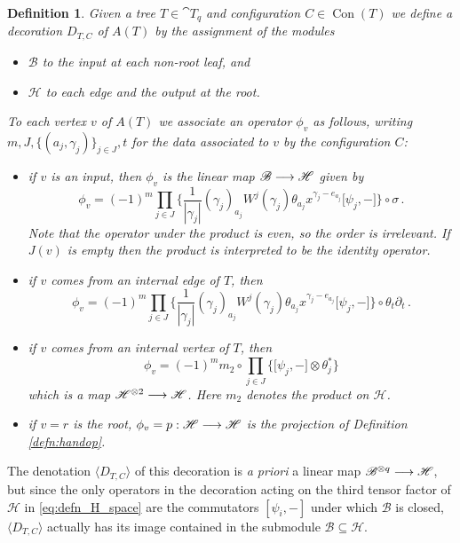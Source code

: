 \documentclass[english,letter paper,12pt,leqno]{article}
\theoremstyle{example}
\newtheorem{definition}[theorem]{Definition}
\numberwithin{equation}{section}
\def\be{\begin{equation}}
\def\ee{\end{equation}}
\begin{document}
\begin{definition} Given a tree $T \in \cat{T}_q$ and configuration $C \in \operatorname{Con}(T)$ we define a decoration $D_{T,C}$ of $A(T)$ by the assignment of the modules
\begin{itemize}
\item $\mathscr{B}$ to the input at each non-root leaf, and
\item $\mathscr{H}$ to each edge and the output at the root.
\end{itemize}
To each vertex $v$ of $A(T)$ we associate an operator $\phi_v$ as follows, writing $m, J, \{ (a_j, \gamma_j) \}_{j \in J}, t$ for the data associated to $v$ by the configuration $C$:
\begin{itemize}
\item if $v$ is an input, then $\phi_v$ is the linear map $\mathscr{B} \longrightarrow \mathscr{H}$ given by
\be\label{eq:int_input}
\phi_v = (-1)^m \prod_{j \in J}\Big\{ \frac{1}{|\gamma_j|}(\gamma_j)_{a_j} W^j( \gamma_j)  \theta_{a_j} x^{\gamma_j - e_{a_j}} \big[ \psi_j, - \big] \Big\} \circ \sigma\,.
\ee
Note that the operator under the product is even, so the order is irrelevant. If $J(v)$ is empty then the product is interpreted to be the identity operator.
\item if $v$ comes from an internal edge of $T$, then
\be\label{eq:int_intedge}
\phi_v = (-1)^m \prod_{j \in J} \Big\{ \frac{1}{|\gamma_j|}(\gamma_j)_{a_j} W^j( \gamma_j)  \theta_{a_j} x^{\gamma_j - e_{a_j}} \big[ \psi_j, - \big] \Big\} \circ \theta_t \partial_t\,.
\ee
\item if $v$ comes from an internal vertex of $T$, then
\be\label{eq:int_intvert}
\phi_v = (-1)^m m_2 \circ \prod_{j \in J} \Big\{ \big[ \psi_j, - \big] \otimes \theta_j^* \Big\}
\ee
which is a map $\mathscr{H}^{\otimes 2} \longrightarrow \mathscr{H}$. Here $m_2$ denotes the product on $\mathscr{H}$.
\item if $v = r$ is the root, $\phi_v = p: \mathscr{H} \longrightarrow \mathscr{H}$ is the projection of Definition \ref{defn:handop}.
\end{itemize}
\end{definition}

The denotation $\langle D_{T,C} \rangle$ of this decoration is \emph{a priori} a linear map $\mathscr{B}^{\otimes q} \longrightarrow \mathscr{H}$, but since the only operators in the decoration acting on the third tensor factor of $\mathscr{H}$ in \eqref{eq:defn_H_space} are the commutators $[\psi_i,-]$ under which $\mathscr{B}$ is closed, $\langle D_{T,C} \rangle$ actually has its image contained in the submodule $\mathscr{B} \subseteq \mathscr{H}$. 
\end{document}
